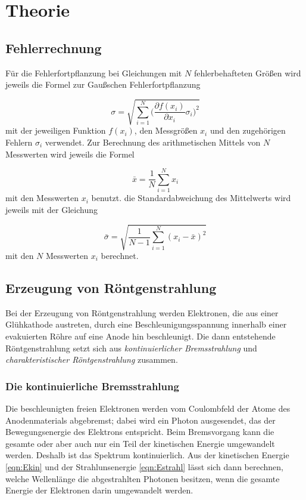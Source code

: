 \section{Theorie}
\label{sec:Theorie}

\subsection{Fehlerrechnung}

Für die Fehlerfortpflanzung bei Gleichungen mit $N$ fehlerbehafteten Größen
wird jeweils die Formel zur Gaußschen Fehlerfortpflanzung

\begin{equation}
  \sigma = \sqrt{\sum_{i=1}^{N}\biggl(\frac{\partial f(x_i)}{\partial x_i}
  \sigma_i\biggr)^2}
\end{equation}
mit der jeweiligen Funktion $f(x_i)$, den Messgrößen $x_i$ und den
zugehörigen Fehlern $\sigma_i$ verwendet.
Zur Berechnung des arithmetischen Mittels von $N$ Messwerten wird jeweils die
Formel

\begin{equation}
  \bar{x} = \frac{1}{N}\sum_{i=1}^{N}x_i
\end{equation}
mit den Messwerten $x_i$ benutzt.
die Standardabweichung des Mittelwerts wird jeweils mit der Gleichung

\begin{equation}
  \bar{\sigma} = \sqrt{\frac{1}{N-1}\sum_{i=1}^{N}(x_i - \bar{x})^2}
\end{equation}
mit den $N$ Messwerten $x_i$ berechnet.

\subsection{Erzeugung von Röntgenstrahlung}

Bei der Erzeugung von Röntgenstrahlung werden Elektronen, die aus einer Glühkathode
austreten, durch eine Beschleunigungsspannung innerhalb einer evakuierten Röhre
auf eine Anode  hin beschleunigt. Die dann entstehende Röntgenstrahlung setzt sich
aus \emph{kontinuierlicher Bremsstrahlung} und \emph{charakteristischer Röntgenstrahlung}
zusammen.

\subsubsection{Die kontinuierliche Bremsstrahlung}

Die beschleunigten freien Elektronen werden vom Coulombfeld der Atome des Anodenmaterials
abgebremst; dabei wird ein Photon ausgesendet, das der Bewegungsenergie des Elektrons
entspricht. Beim Bremsvorgang kann die gesamte oder aber auch nur ein Teil der
kinetischen Energie umgewandelt werden. Deshalb ist das Spektrum kontinuierlich.
Aus der kinetischen Energie \eqref{eqn:Ekin} und der Strahlunsenergie \eqref{eqn:Estrahl}
lässt sich dann berechnen, welche Wellenlänge die abgestrahlten Photonen besitzen, wenn
die gesamte Energie der Elektronen darin umgewandelt werden.

